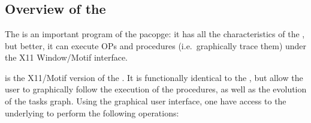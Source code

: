 
\part{\XPK{}}

\chapter*{Overview of the \XPK{}}

The \XPK{} is an important program of the \COPRSDE{} pacopge: it has
all the characteristics of the \CPK{}, but better, it can execute OPs and
procedures (i.e.\ graphically trace them) under the X11 Window/Motif
interface.

\XPK{} is the X11/Motif version of the \CPK{}. It is functionally identical to
the \CPK{}, but allow the user to graphically follow the execution of the
procedures, as well as the evolution of the tasks graph.  Using the graphical
user interface, one have access to the underlying
\CPK{} to perform the following operations:

